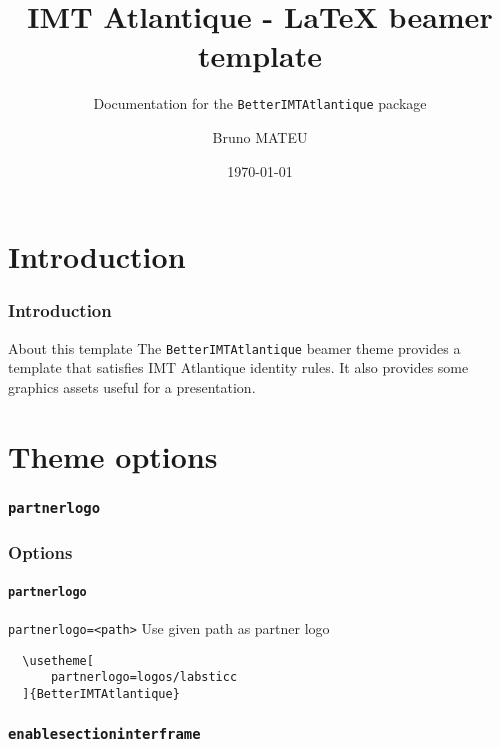 \documentclass{beamer}
\title{IMT Atlantique - \LaTeX{} beamer template}
\subtitle{Documentation for the \texttt{BetterIMTAtlantique} package}
\date{\noexpand\today}
\author[B.~MATEU]{Bruno MATEU}
\begin{document}
\begin{frame}[plain]
    \titlepage
\end{frame}

\inserttoc

\section{Introduction}

\begin{frame}[c]
    \frametitle{Introduction}

    \begin{blueblock}{About this template}
        The \texttt{BetterIMTAtlantique} beamer theme provides a template that satisfies IMT Atlantique
        identity rules. It also provides
        some graphics assets useful for a presentation.
    \end{blueblock}
\end{frame}

\section{Theme options}%
\label{sec:theme_options}

\subsubsection{\texttt{partnerlogo}}%
\label{ssub:partnerlogo}


\begin{frame}[c,fragile]
    \frametitle{Options}
    \framesubtitle{\texttt{partnerlogo}}

    \begin{blueblock}{\texttt{partnerlogo=<path>}}
        Use given path as partner logo
    \end{blueblock}

    \begin{example}
        \small
        \begin{verbatim}
  \usetheme[
      partnerlogo=logos/labsticc
  ]{BetterIMTAtlantique}
        \end{verbatim}
    \end{example}
\end{frame}

\subsubsection{\texttt{enablesectioninterframe}}%
\label{ssub:enablesectioninterframe}
\end{document}
